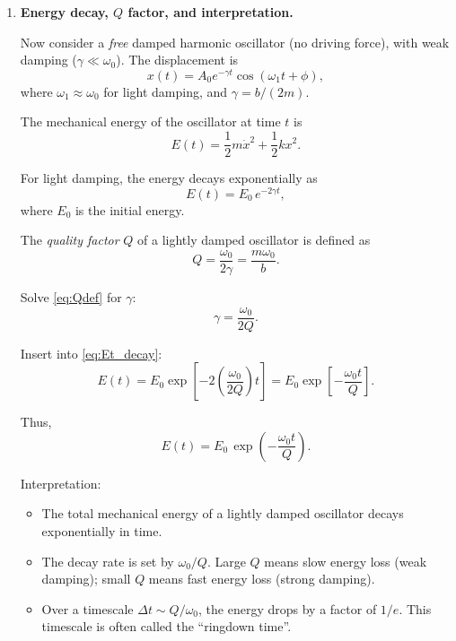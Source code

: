 \documentclass[12pt]{article}
\begin{document}
\begin{enumerate}
\item \textbf{Energy decay, $Q$ factor, and interpretation.}

Now consider a \emph{free} damped harmonic oscillator (no driving force), with weak damping ($\gamma \ll \omega_0$). The displacement is
\[
x(t) = A_0 e^{-\gamma t} \cos(\omega_1 t + \phi),
\]
where $\omega_1 \approx \omega_0$ for light damping, and $\gamma = b/(2m)$.

The mechanical energy of the oscillator at time $t$ is
\[
E(t) = \frac{1}{2} m \dot{x}^2 + \frac{1}{2} k x^2.
\]

For light damping, the energy decays exponentially as
\begin{equation}
E(t) = E_0 \, e^{-2 \gamma t},
\label{eq:Et_decay}
\end{equation}
where $E_0$ is the initial energy.

The \emph{quality factor} $Q$ of a lightly damped oscillator is defined as
\begin{equation}
Q = \frac{\omega_0}{2\gamma}
= \frac{m \omega_0}{b}.
\label{eq:Qdef}
\end{equation}

Solve \eqref{eq:Qdef} for $\gamma$:
\[
\gamma = \frac{\omega_0}{2Q}.
\]

Insert into \eqref{eq:Et_decay}:
\[
E(t) = E_0 \exp\!\left[-2 \left(\frac{\omega_0}{2Q}\right) t \right]
= E_0 \exp\!\left[- \frac{\omega_0 t}{Q} \right].
\]

Thus,
\begin{equation}
\boxed{
E(t) = E_0 \, \exp\!\left( - \frac{\omega_0 t}{Q} \right).
}
\end{equation}

Interpretation:

\begin{itemize}
    \item The total mechanical energy of a lightly damped oscillator decays exponentially in time.
    \item The decay rate is set by $\omega_0/Q$. Large $Q$ means slow energy loss (weak damping); small $Q$ means fast energy loss (strong damping).
    \item Over a timescale $\Delta t \sim Q/\omega_0$, the energy drops by a factor of $1/e$. This timescale is often called the ``ringdown time''.
\end{itemize}

\end{enumerate}
\end{document}
